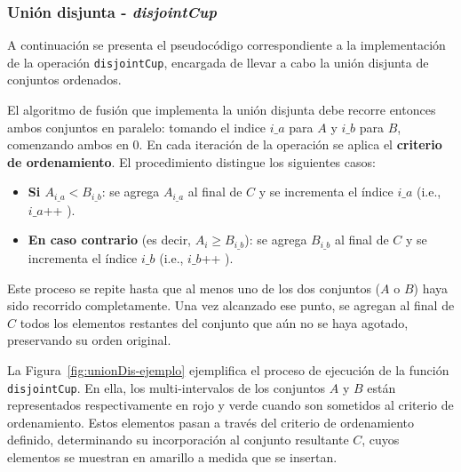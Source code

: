 \newpage
\subsubsection{Unión disjunta - \textit{disjointCup}}

A continuación se presenta el pseudocódigo correspondiente a la implementación de la operación \texttt{disjointCup}, encargada de llevar a cabo la unión disjunta de conjuntos ordenados. 

El algoritmo de fusión que implementa la unión disjunta debe recorre entonces ambos conjuntos en paralelo: tomando el indice $i\_a$ para $A$ y $i\_b$ para $B$, comenzando ambos en 0. En cada iteración de la operación se aplica el \textbf{criterio de ordenamiento}. El procedimiento distingue los siguientes casos:

\begin{itemize}
    \item \textbf{Si $A_{i\_a} < B_{i\_b}$}: se agrega $A_{i\_a}$ al final de $C$ y se incrementa el índice ${i\_a}$ (i.e., $i\_a$\!+\!+ ).
    \item \textbf{En caso contrario} (es decir, $A_i \geq B_{i\_b}$): se agrega $B_{i\_b}$ al final de $C$ y se incrementa el índice $i\_b$ (i.e., $i\_b$\!+\!+ ).
\end{itemize}

Este proceso se repite hasta que al menos uno de los dos conjuntos ($A$ o $B$) haya sido recorrido completamente. Una vez alcanzado ese punto, se agregan al final de $C$ todos los elementos restantes del conjunto que aún no se haya agotado, preservando su orden original.

La Figura~\ref{fig:unionDis-ejemplo} ejemplifica el proceso de ejecución de la función \texttt{disjointCup}. En ella, los multi-intervalos de los conjuntos $A$ y $B$ están representados respectivamente en rojo y verde cuando son sometidos al criterio de ordenamiento. Estos elementos pasan a través del criterio de ordenamiento definido, determinando su incorporación al conjunto resultante $C$, cuyos elementos se muestran en amarillo a medida que se insertan.


